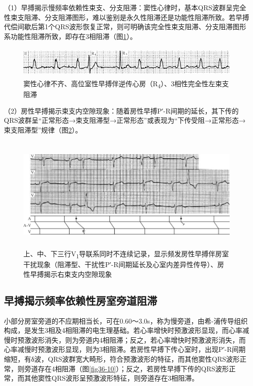 （1）早搏揭示慢频率依赖性束支、分支阻滞：窦性心律时，基本QRS波群呈完全性束支阻滞、分支阻滞图形，难以鉴别是永久性阻滞还是功能性阻滞所致。若早搏代偿间歇后第1个QRS波形恢复正常，则可明确该完全性束支阻滞、分支阻滞图形系功能性阻滞所致，即存在3相阻滞（图\ref{fig36-8}）。

\begin{figure}[!htbp]
 \centering
 \includegraphics[width=5.58333in,height=0.61458in]{./images/Image00580.jpg}
 \captionsetup{justification=centering}
 \caption{窦性心律不齐、高位室性早搏伴逆传心房（R\textsubscript{4}）、3相性完全性左束支阻滞}
 \label{fig36-8}
  \end{figure} 


（2）房性早搏揭示束支内空隙现象：随着房性早搏P′-R间期的延长，其下传的QRS波群呈“正常形态→束支阻滞型→正常形态”或表现为“下传受阻→正常形态→束支阻滞型”规律（图\ref{fig36-9}）。

\begin{figure}[!htbp]
 \centering
 \includegraphics[width=5.79167in,height=2.25in]{./images/Image00581.jpg}
 \captionsetup{justification=centering}
 \caption{上、中、下三行V\textsubscript{1}导联系同时不连续记录，显示频发房性早搏伴房室干扰现象（阻滞型、干扰性P′-R间期延长及心室内差异性传导）、房性早搏揭示右束支内空隙现象}
 \label{fig36-9}
  \end{figure} 


\protect\hypertarget{text00043.htmlux5cux23subid473}{}{}

\subsection{早搏揭示频率依赖性房室旁道阻滞}

小部分房室旁道的不应期相当长，可在0.60～3.0s，称为慢旁道，由希-浦传导组织构成，是发生3相及4相阻滞的电生理基础。若心率增快时预激波形显现，而心率减慢时预激波形消失，则为旁道内4相阻滞；反之，若心率增快时预激波形消失，而心率减慢时预激波形显现，则为3相阻滞。若房性早搏下传心室时，出现P′-R间期缩短，有δ波，QRS波群宽大畸形，符合预激波形的特征，而其他窦性QRS波形正常，则旁道存在4相阻滞（图\ref{fig36-10}）；反之，若房性早搏下传的QRS波形正常，而其他窦性QRS波形呈预激波形特征，则旁道存在3相阻滞。

